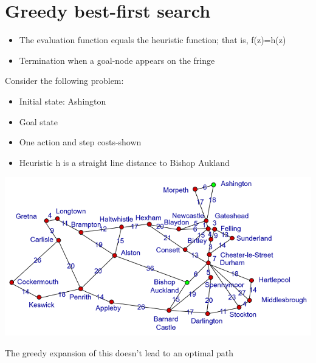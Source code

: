 \documentclass{article}[18pt]
\begin{document}
\section{Greedy best-first search}
\begin{itemize}
	\item The evaluation function equals the heuristic function; that is, f(z)=h(z)
	\item Termination when a goal-node appears on the fringe
\end{itemize}
Consider the following problem:
\begin{itemize}
	\item Initial state: Ashington
	\item Goal state
	\item One action and step costs-shown
	\item Heuristic h is a straight line distance to Bishop Aukland
\end{itemize}
\begin{center}
	\includegraphics[scale=1]{"ashington to bishop aukland"}
\end{center}
The greedy expansion of this doesn't lead to an optimal path
\end{document}
